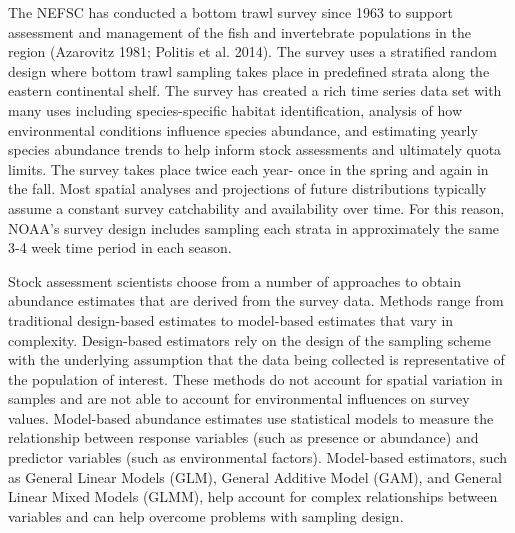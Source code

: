 \documentclass[
  12pt,
]{article}
\begin{document}
The NEFSC has conducted a bottom trawl survey since 1963 to support assessment and management of the fish and invertebrate populations in the region (Azarovitz 1981; Politis et al. 2014). The survey uses a stratified random design where bottom trawl sampling takes place in predefined strata along the eastern continental shelf. The survey has created a rich time series data set with many uses including species-specific habitat identification, analysis of how environmental conditions influence species abundance, and estimating yearly species abundance trends to help inform stock assessments and ultimately quota limits. The survey takes place twice each year- once in the spring and again in the fall. Most spatial analyses and projections of future distributions typically assume a constant survey catchability and availability over time. For this reason, NOAA's survey design includes sampling each strata in approximately the same 3-4 week time period in each season.

Stock assessment scientists choose from a number of approaches to obtain abundance estimates that are derived from the survey data. Methods range from traditional design-based estimates to model-based estimates that vary in complexity. Design-based estimators rely on the design of the sampling scheme with the underlying assumption that the data being collected is representative of the population of interest. These methods do not account for spatial variation in samples and are not able to account for environmental influences on survey values. Model-based abundance estimates use statistical models to measure the relationship between response variables (such as presence or abundance) and predictor variables (such as environmental factors). Model-based estimators, such as General Linear Models (GLM), General Additive Model (GAM), and General Linear Mixed Models (GLMM), help account for complex relationships between variables and can help overcome problems with sampling design.
\end{document}
